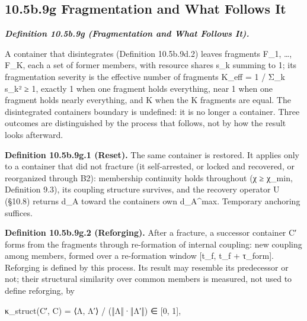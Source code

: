 \documentclass[
]{article}
\begin{document}
\hypertarget{b.9g-fragmentation-and-what-follows-it}{%
\subsection{10.5b.9g Fragmentation and What Follows
It}\label{b.9g-fragmentation-and-what-follows-it}}

\emph{\textbf{Definition 10.5b.9g (Fragmentation and What Follows It).}}

A container that disintegrates (Definition 10.5b.9d.2) leaves fragments
F\_1, \ldots, F\_K, each a set of former members, with resource shares
s\_k summing to 1; its fragmentation severity is the effective number of
fragments K\_eff = 1 / Σ\_k s\_k² ≥ 1, exactly 1 when one fragment holds
everything, near 1 when one fragment holds nearly everything, and K when
the K fragments are equal. The disintegrated container\textquotesingle s
boundary is undefined: it is no longer a container. Three outcomes are
distinguished by the process that follows, not by how the result looks
afterward.

\textbf{Definition 10.5b.9g.1 (Reset).} The same container is restored.
It applies only to a container that did not fracture (it self-arrested,
or locked and recovered, or reorganized through B2): membership
continuity holds throughout (χ ≥ χ\_min, Definition 9.3), its coupling
structure survives, and the recovery operator U (§10.8) returns d\_A
toward the container\textquotesingle s own d\_A\^{}max. Temporary
anchoring suffices.

\textbf{Definition 10.5b.9g.2 (Reforging).} After a fracture, a
successor container C′ forms from the fragments through re-formation of
internal coupling: new coupling among members, formed over a
re-formation window {[}t\_f, t\_f + τ\_form{]}. Reforging is defined by
this process. Its result may resemble its predecessor or not; their
structural similarity over common members is measured, not used to
define reforging, by

κ\_struct(C′, C) = ⟨Λ, Λ′⟩ / (‖Λ‖·‖Λ′‖) ∈ {[}0, 1{]},
\end{document}

